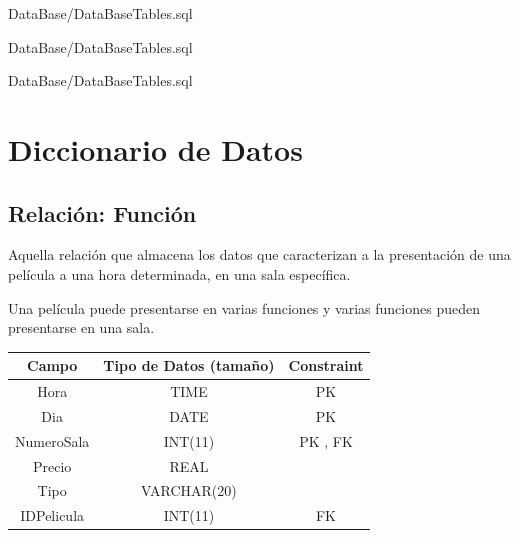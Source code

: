 \documentclass[12pt, fleqn]{report}                             %
\begin{document}
            
            {DataBase/DataBaseTables.sql}
            \clearpage

            
            {DataBase/DataBaseTables.sql}
            \clearpage

            
            {DataBase/DataBaseTables.sql}



    \clearpage
    \section{Diccionario de Datos}


        \subsection*{Relación: Función}

            Aquella relación que almacena los datos que caracterizan a la presentación
            de una película a una hora determinada, en una sala específica.

            Una película puede presentarse en varias funciones y varias funciones pueden
            presentarse en una sala.

            \vspace{2em}

            \small{
            \begin{tabular}{| c | c | c |}
                \hline
                \textbf{Campo} & \textbf{Tipo de Datos (tamaño)} & \textbf{Constraint} \\[0.5ex] 
                \hline\hline
                
                Hora        & TIME          & PK                        \\
                Dia         & DATE          & PK                        \\
                NumeroSala  & INT(11)       & PK , FK                   \\
                Precio      & REAL          &                           \\
                Tipo        & VARCHAR(20)   &                           \\
                IDPelicula  & INT(11)       & FK                        \\
                \hline
            \end{tabular}
            }
\end{document}
